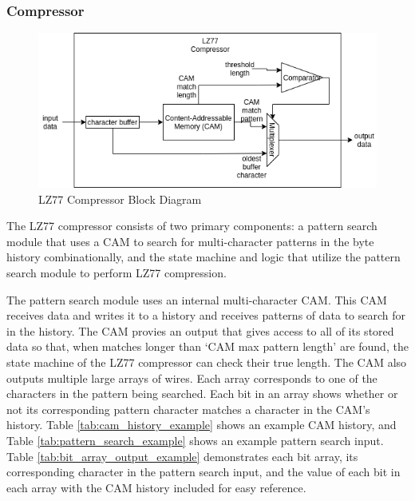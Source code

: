 \documentclass[doublespace,nopageskip]{VTthesis}
\begin{document}
\subsubsection{Compressor}\label{sss:lz77_compressor_implementation}

\begin{figure}[htb]
	\centering
	\includegraphics[scale=0.8]{LZ77 Compressor.png}
	\caption{LZ77 Compressor Block Diagram}
	\label{fig:lz77_compressor_block_diagram}
\end{figure}

The LZ77 compressor consists of two primary components: a pattern search module that uses a CAM to search for multi-character patterns in the byte history combinationally, and the state machine and logic that utilize the pattern search module to perform LZ77 compression.

The pattern search module uses an internal multi-character CAM. This CAM receives data and writes it to a history and receives patterns of data to search for in the history. The CAM provies an output that gives access to all of its stored data so that, when matches longer than `CAM max pattern length' are found, the state machine of the LZ77 compressor can check their true length. The CAM also outputs multiple large arrays of wires. Each array corresponds to one of the characters in the pattern being searched. Each bit in an array shows whether or not its corresponding pattern character matches a character in the CAM's history. Table \ref{tab:cam_history_example} shows an example CAM history, and Table \ref{tab:pattern_search_example} shows an example pattern search input. Table \ref{tab:bit_array_output_example} demonstrates each bit array, its corresponding character in the pattern search input, and the value of each bit in each array with the CAM history included for easy reference.
\end{document}
